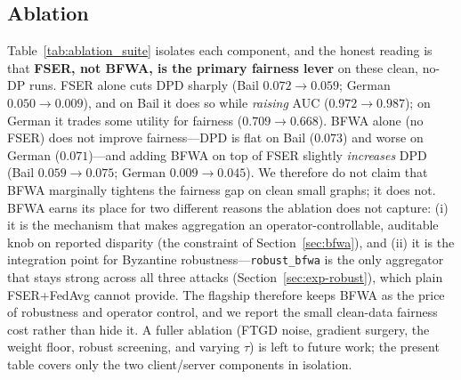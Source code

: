 \documentclass[pdflatex,sn-mathphys-num]{sn-jnl}
\theoremstyle{thmstyleone}%
\theoremstyle{thmstyletwo}%
\theoremstyle{thmstylethree}%
\begin{document}
\begin{table}[t]\centering\small
\caption{Demographic Parity Difference (DPD, lower is fairer).}
\label{tab:main-dpd}
{\footnotesize\setlength{\tabcolsep}{3pt}}
\end{table}

\begin{table}[t]\centering\small
\caption{Equal Opportunity Difference (EOD, lower is fairer).}
\label{tab:main-eod}
{\footnotesize\setlength{\tabcolsep}{3pt}}
\end{table}

\subsection{Ablation}
\label{sec:exp-ablation}
Table~\ref{tab:ablation_suite} isolates each component, and the honest reading is that
\textbf{FSER, not BFWA, is the primary fairness lever} on these clean, no-DP
runs. FSER alone cuts DPD sharply (Bail $0.072\!\to\!0.059$; German
$0.050\!\to\!0.009$), and on Bail it does so while \emph{raising} AUC
($0.972\!\to\!0.987$); on German it trades some utility for fairness
($0.709\!\to\!0.668$). BFWA alone (no FSER) does not improve fairness---DPD is
flat on Bail ($0.073$) and worse on German ($0.071$)---and adding BFWA on top of
FSER slightly \emph{increases} DPD (Bail $0.059\!\to\!0.075$; German
$0.009\!\to\!0.045$). We therefore do not claim that BFWA marginally tightens the
fairness gap on clean small graphs; it does not. BFWA earns its place for two
different reasons the ablation does not capture: (i) it is the mechanism that
makes aggregation an operator-controllable, auditable knob on reported disparity
(the constraint of Section~\ref{sec:bfwa}), and (ii) it is the integration point
for Byzantine robustness---\texttt{robust\_bfwa} is the only aggregator that
stays strong across all three attacks (Section~\ref{sec:exp-robust}), which plain
FSER+FedAvg cannot provide. The flagship therefore keeps BFWA as the price of
robustness and operator control, and we report the small clean-data fairness cost
rather than hide it. A fuller ablation (FTGD noise, gradient surgery, the weight
floor, robust screening, and varying $\tau$) is left to future work; the present
table covers only the two client/server components in isolation.


\end{document}
